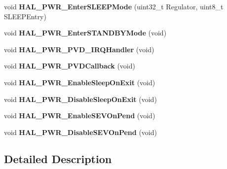 \begin{DoxyCompactItemize}
\item 
\mbox{\label{group___p_w_r___exported___functions___group2_ga5c84f4e046525c22d233c8a3443fab5f}} 
void {\bfseries H\+A\+L\+\_\+\+P\+W\+R\+\_\+\+Enter\+S\+L\+E\+E\+P\+Mode} (uint32\+\_\+t Regulator, uint8\+\_\+t S\+L\+E\+E\+P\+Entry)
\item 
\mbox{\label{group___p_w_r___exported___functions___group2_ga40736f74c169077fcd08f34470559aa2}} 
void {\bfseries H\+A\+L\+\_\+\+P\+W\+R\+\_\+\+Enter\+S\+T\+A\+N\+D\+B\+Y\+Mode} (void)
\item 
\mbox{\label{group___p_w_r___exported___functions___group2_gae3403237bde597d72b32f0434932a047}} 
void {\bfseries H\+A\+L\+\_\+\+P\+W\+R\+\_\+\+P\+V\+D\+\_\+\+I\+R\+Q\+Handler} (void)
\item 
\mbox{\label{group___p_w_r___exported___functions___group2_gaa4843b3eb7989f5b95e1218af4086940}} 
void {\bfseries H\+A\+L\+\_\+\+P\+W\+R\+\_\+\+P\+V\+D\+Callback} (void)
\item 
\mbox{\label{group___p_w_r___exported___functions___group2_ga85d0154c96068b286072a64fca4c7e6a}} 
void {\bfseries H\+A\+L\+\_\+\+P\+W\+R\+\_\+\+Enable\+Sleep\+On\+Exit} (void)
\item 
\mbox{\label{group___p_w_r___exported___functions___group2_ga1da299e8186a3e08a694865bd41c3bb0}} 
void {\bfseries H\+A\+L\+\_\+\+P\+W\+R\+\_\+\+Disable\+Sleep\+On\+Exit} (void)
\item 
\mbox{\label{group___p_w_r___exported___functions___group2_ga6f33b1c8c8cc85129c68ac302a281033}} 
void {\bfseries H\+A\+L\+\_\+\+P\+W\+R\+\_\+\+Enable\+S\+E\+V\+On\+Pend} (void)
\item 
\mbox{\label{group___p_w_r___exported___functions___group2_ga7811014def9b864dd490a63ada4bab68}} 
void {\bfseries H\+A\+L\+\_\+\+P\+W\+R\+\_\+\+Disable\+S\+E\+V\+On\+Pend} (void)
\end{DoxyCompactItemize}


\subsection{Detailed Description}
